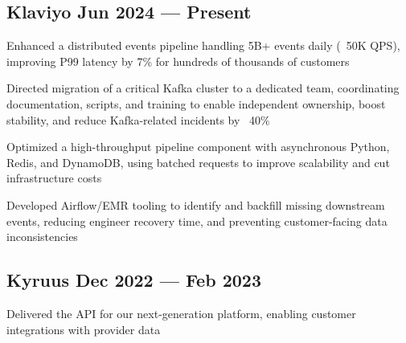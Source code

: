 
\subsection{{Klaviyo \hfill Jun 2024 --- Present}}
\begin{zitemize}
\item Enhanced a distributed events pipeline handling 5B+ events daily (~50K QPS), improving P99 latency by 7\% for hundreds of thousands of customers
\item Directed migration of a critical Kafka cluster to a dedicated team, coordinating documentation, scripts, and training to enable independent ownership, boost stability, and reduce Kafka-related incidents by ~40\%
\item Optimized a high-throughput pipeline component with asynchronous Python, Redis, and DynamoDB, using batched requests to improve scalability and cut infrastructure costs
\item Developed Airflow/EMR tooling to identify and backfill missing downstream events, reducing engineer recovery time, and preventing customer-facing data inconsistencies
\end{zitemize}


\subsection{{Kyruus \hfill Dec 2022 --- Feb 2023}}
\begin{zitemize}
\item Delivered the API for our next-generation platform, enabling customer integrations with provider data
\end{zitemize}

